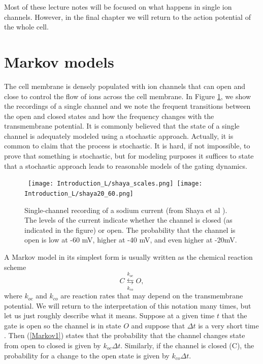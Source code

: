 Most of these lecture notes will be focused on what happens in single ion channels. However, in the final chapter we will return to the
action potential of the whole cell.

\section{Markov models  \label{markovintro}}

The cell membrane is densely populated with ion channels that can open and close to control the flow of ions across the cell membrane. In Figure
\ref{Introduction/na_cropped.png}, we show the recordings of a single channel and we note the frequent transitions between the open and closed states and how the frequency changes with the transmembrane potential. It is commonly believed that the state of a single channel is adequately modeled using a stochastic approach. Actually, it is common to claim that the process is stochastic. It is hard,  if not impossible, to prove that something is stochastic, but for modeling purposes it suffices to state that a stochastic approach leads to reasonable models of the gating dynamics. 



\begin{figure}[h]\centering
\hbox{
\texttt{[image: Introduction\_L/shaya\_scales.png]}
\texttt{[image: Introduction\_L/shaya20\_60.png]}
}
\caption{Single-channel recording of a sodium current (from Shaya et al \cite{Shaya2011}). 
The levels of the current indicate whether the channel is closed (as indicated in the figure) or open. The probability that the channel is open is low at -60 mV, higher at -40 mV, and even higher at -20mV. \label{Introduction/na_cropped.png}}
\end{figure}



A Markov model in its simplest form is usually written as the chemical reaction scheme 
\begin{equation}
C\underset{k_{co}}{\overset{k_{oc}}{\leftrightarrows}}O, \label{Markov1}%
\end{equation}
where $k_{oc}$ and $k_{co}$ are reaction rates that may depend on the transmembrane potential. We will return to the interpretation of this notation many times, but let us just roughly describe what it means. Suppose at a given time $t$ that the gate is open so the channel is in state $O$ and suppose that $\Delta t$ is a very short time . Then (\ref{Markov1}) states that the probability that the channel changes state from open to closed is given by $ k_{oc} \Delta t$. Similarly, if the channel is closed (C), the probability for a change to the open state is given by $ k_{co} \Delta t$. 


